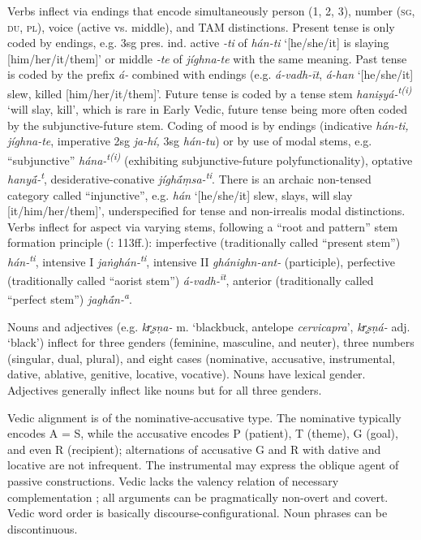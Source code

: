 \documentclass[output=paper]{langscibook}
\begin{document}
{Verbs inflect via endings that encode simultaneously {person} (1, 2, 3), {number} (\textsc{sg}, \textsc{du}, \textsc{pl}), {voice} (active vs. middle), and TAM distinctions. Present {tense} is only coded by endings, e.g. 3sg pres. ind. active \textit{{}-ti} of \textit{hán-ti} ‘[he/she/it] is slaying [him/her/it/them]’ or middle \textit{{}-te} of \textit{jíghna-te} with the same meaning. Past tense is coded by the prefix \textit{á-} combined with endings (e.g. \textit{á-vadh-īt}, \textit{á-han} ‘[he/she/it] slew, killed [him/her/it/them]’. Future tense is coded by a tense stem \textit{haniṣyá-\textsuperscript{t(i)}} ‘will slay, kill’, which is rare in Early Vedic, future tense being more often coded by the subjunctive-future stem. Coding of {mood} is by endings (indicative \textit{hán-ti, jíghna-te}, imperative 2sg \textit{ja-hí,} 3sg \textit{hán-tu}) or by use of modal stems, e.g. “subjunctive” \textit{hána-\textsuperscript{t(i)}} (exhibiting subjunctive-future polyfunctionality), optative \textit{hany\'{ā}-}\textit{\textsuperscript{t}}, desiderative-conative \textit{jígh\'{ā}ṃsa-}\textit{\textsuperscript{ti}}. There is an archaic non-tensed category called “injunctive”, e.g. \textit{hán} ‘[he/she/it] slew, slays, will slay [it/him/her/them]’, underspecified for tense and non-irrealis modal distinctions. Verbs inflect for {aspect} via varying stems, following a “root and pattern” stem formation principle (\citealt{Pooth2014}: 113ff.): imperfective (traditionally called “present stem”) \textit{hán-\textsuperscript{ti}}, intensive I \textit{jaṅghán-\textsuperscript{ti}}, intensive II \textit{ghánighn-ant-} (participle), perfective (traditionally called “aorist stem”) \textit{á-vadh-\textsuperscript{īt}}, anterior (traditionally called “perfect stem”) \textit{jagh\'{ā}n-}\textit{\textsuperscript{a}}.}

{Nouns and adjectives (e.g. \textit{kr̥ṣṇa-} m. ‘blackbuck, antelope \textit{cervicapra}’, \textit{kr̥ṣṇá-} adj. ‘black’) inflect for three genders (feminine, masculine, and neuter), three numbers (singular, dual, plural), and eight cases (nominative, accusative, instrumental, dative, ablative, genitive, locative, vocative). Nouns have lexical gender. Adjectives generally inflect like nouns but for all three genders.}

{Vedic {alignment} is of the {nominative-accusative} {type}. The nominative typically encodes A = S, while the accusative encodes P (patient), T (theme), G (goal), and even R (recipient); alternations of accusative G and R with dative and locative are not infrequent. The instrumental may express the oblique agent of passive constructions. Vedic lacks the valency relation of necessary complementation \citep[281-301]{Pooth2014}; all arguments can be pragmatically non-overt and covert. Vedic word order is basically discourse-configurational. Noun phrases can be discontinuous. }
\end{document}
